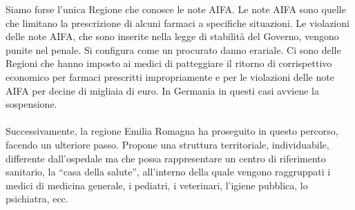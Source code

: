 Siamo forse l'unica Regione che conosce le note AIFA. Le note AIFA sono
quelle che limitano la prescrizione di alcuni farmaci a specifiche
situazioni. Le violazioni delle note AIFA, che sono inserite nella legge
di stabilità del Governo, vengono punite nel penale. Si configura come
un procurato danno erariale. Ci sono delle Regioni che hanno imposto ai
medici di patteggiare il ritorno di corrispettivo economico per farmaci
prescritti impropriamente e per le violazioni delle note AIFA per decine
di migliaia di euro. In Germania in questi casi avviene la sospensione.
\\\\
Successivamente, la regione Emilia Romagna ha proseguito in questo
percorso, facendo un ulteriore passo. Propone una struttura
territoriale, individuabile, differente dall'ospedale ma che possa
rappresentare un centro di riferimento sanitario, la ``casa della
salute'', all'interno della quale vengono raggruppati i medici di
medicina generale, i pediatri, i veterinari, l'igiene pubblica, lo
psichiatra, ecc.

